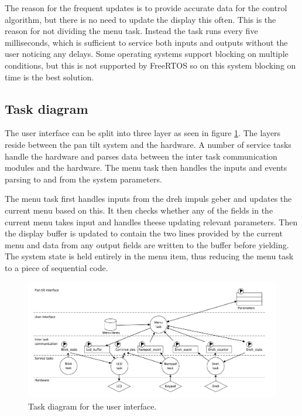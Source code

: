 The reason for the frequent updates is to provide accurate data for the control algorithm, but there is no need to update the display this often. This is the reason for not dividing the menu task. Instead the task runs every five milliseconds, which is sufficient to service both inputs and outputs without the user noticing any delays. Some operating systems support blocking on multiple conditions, but this is not supported by FreeRTOS so on this system blocking on time is the best solution.

\subsection{Task diagram}
The user interface can be split into three layer as seen in figure \ref{fig:ui_task_diagram}. The layers reside between the pan tilt system and the hardware. A number of service tasks handle the hardware and parses data between the inter task communication modules and the hardware. The menu task then handles the inputs and events parsing to and from the system parameters.

The menu task first handles inputs from the dreh impuls geber and updates the current menu based on this. It then checks whether any of the fields in the current menu takes input and handles theese updating relevant parameters. Then the display buffer is updated to contain the two lines provided by the current menu and data from any output fields are written to the buffer before yielding. The system state is held entirely in the menu item, thus reducing the menu task to a piece of sequential code.

\begin{figure}[htb]
  \centering
  \includegraphics[width=\textwidth,clip,trim=0 5 0 0]{graphics/task_diagram_user_interface.pdf} 
  \caption{Task diagram for the user interface.}
  \label{fig:ui_task_diagram}
\end{figure}

